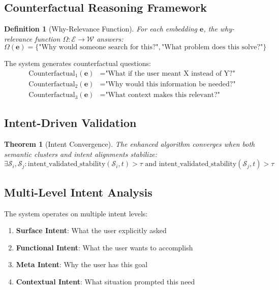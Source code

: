 \documentclass{article}
\newtheorem{definition}{Definition}
\newtheorem{theorem}{Theorem}
\begin{document}
\subsection{Counterfactual Reasoning Framework}

\begin{definition}[Why-Relevance Function]
For each embedding $\mathbf{e}$, the why-relevance function $\Omega: \mathcal{E} \rightarrow \mathcal{W}$ answers:
$$\Omega(\mathbf{e}) = \{\text{"Why would someone search for this?"}, \text{"What problem does this solve?"}\}$$
\end{definition}

The system generates counterfactual questions:
\begin{align}
\text{Counterfactual}_1(\mathbf{e}) &= \text{"What if the user meant X instead of Y?"} \\
\text{Counterfactual}_2(\mathbf{e}) &= \text{"Why would this information be needed?"} \\
\text{Counterfactual}_3(\mathbf{e}) &= \text{"What context makes this relevant?"}
\end{align}

\subsection{Intent-Driven Validation}

\begin{theorem}[Intent Convergence]
The enhanced algorithm converges when both semantic clusters and intent alignments stabilize:
$$\exists \mathcal{S}_i, \mathcal{S}_j : \text{intent\_validated\_stability}(\mathcal{S}_i, t) > \tau \text{ and } \text{intent\_validated\_stability}(\mathcal{S}_j, t) > \tau$$
\end{theorem}

\subsection{Multi-Level Intent Analysis}

The system operates on multiple intent levels:

\begin{enumerate}
\item \textbf{Surface Intent}: What the user explicitly asked
\item \textbf{Functional Intent}: What the user wants to accomplish  
\item \textbf{Meta Intent}: Why the user has this goal
\item \textbf{Contextual Intent}: What situation prompted this need
\end{enumerate}
\end{document}
